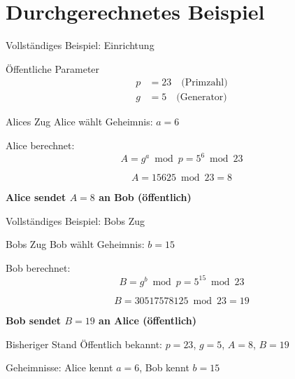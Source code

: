 \documentclass[handout]{beamer}
\begin{document}
\section{Durchgerechnetes Beispiel}

\begin{frame}{Vollständiges Beispiel: Einrichtung}
\begin{block}{Öffentliche Parameter}
\begin{align*}
p &= 23 \quad \text{(Primzahl)} \\
g &= 5 \quad \text{(Generator)}
\end{align*}
\end{block}

\pause

\begin{block}{Alices Zug}
Alice wählt Geheimnis: $a = 6$

Alice berechnet:
\[
A = g^a \bmod p = 5^6 \bmod 23
\]

\pause

\[
A = 15625 \bmod 23 = 8
\]

\textbf{Alice sendet $A = 8$ an Bob (öffentlich)}
\end{block}
\end{frame}

\begin{frame}{Vollständiges Beispiel: Bobs Zug}
\begin{block}{Bobs Zug}
Bob wählt Geheimnis: $b = 15$

Bob berechnet:
\[
B = g^b \bmod p = 5^{15} \bmod 23
\]

\pause

\[
B = 30517578125 \bmod 23 = 19
\]

\textbf{Bob sendet $B = 19$ an Alice (öffentlich)}
\end{block}

\pause

\begin{alertblock}{Bisheriger Stand}
Öffentlich bekannt: $p = 23$, $g = 5$, $A = 8$, $B = 19$

Geheimnisse: Alice kennt $a = 6$, Bob kennt $b = 15$
\end{alertblock}
\end{frame}
\end{document}
